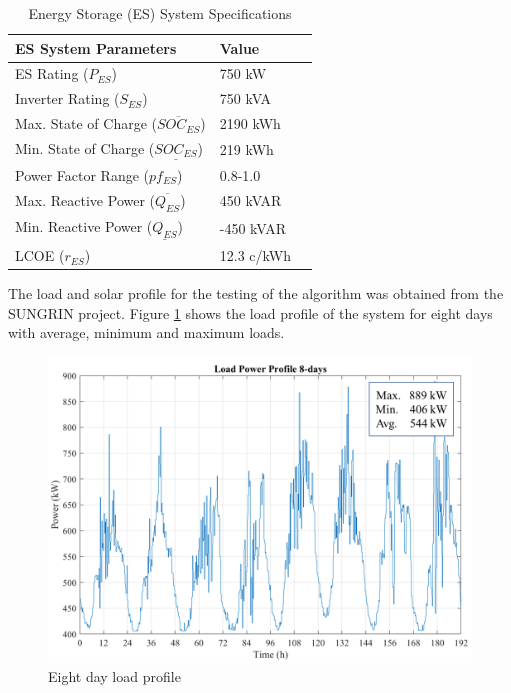 \begin{table}[htb]
\normalsize
\renewcommand{\arraystretch}{1}
\caption{Energy Storage (ES) System Specifications}
\label{tab:es}
\centering
    \begin{tabular}{ | l | p{3cm} | p{3cm} | }
    \hline
    \textbf{ES System Parameters} & \textbf{Value} \\ \hline
    ES Rating (\(P_{ES}\)) & 750 kW  \\ \hline
    Inverter Rating (\(S_{ES}\)) & 750 kVA \\ \hline
    Max. State of Charge  (\(\overline{SOC_{ES}}\)) & 2190 kWh \\ \hline
    Min. State of Charge  (\(\underline{SOC_{ES}}\)) & 219 kWh \\ \hline
    Power Factor Range (\(pf_{ES}\)) & 0.8-1.0  \\ \hline
    Max. Reactive Power (\(\overline{Q_{ES}}\)) & 450 kVAR \\ \hline
    Min. Reactive Power (\(\underline{Q_{ES}}\)) & -450 kVAR \\ \hline
    LCOE (\(r_{ES}\)) & 12.3 c/kWh \\ \hline
    \end{tabular}
\end{table}

The load and solar profile for the testing of the algorithm was obtained from the SUNGRIN project. Figure \ref{fig:LOAD_PROFILE_8} shows the load profile of the system for eight days with average, minimum and maximum loads.

\begin{figure}[!ht]
    \centering
    \includegraphics[width = \linewidth]{figs/loadprofile.png}
    \caption{Eight day load profile}
    \label{fig:LOAD_PROFILE_8}
\end{figure}

